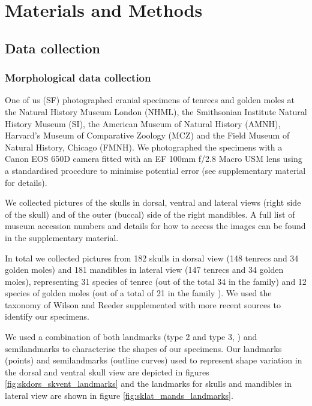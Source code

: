 \documentclass[12pt,a4paper]{article}
\begin{document}
\section{Materials and Methods}

\subsection{Data collection} 

\subsubsection{Morphological data collection} 
	
	One of us (SF) photographed cranial specimens of tenrecs and golden moles at the Natural History Museum London (NHML), the Smithsonian Institute Natural History Museum (SI), the American Museum of Natural History (AMNH), Harvard's Museum of Comparative Zoology (MCZ) and the Field Museum of Natural History, Chicago (FMNH). We photographed the specimens with a Canon EOS 650D camera fitted with an EF 100mm f/2.8 Macro USM lens using a standardised procedure to minimise potential error (see supplementary material for details). 

	We collected pictures of the skulls in dorsal, ventral and lateral views (right side of the skull) and of the outer (buccal) side of the right mandibles. A full list of museum accession numbers and details for how to access the images can be found in the supplementary material.

	In total we collected pictures from 182 skulls in dorsal view (148 tenrecs and 34 golden moles) and 181 mandibles in lateral view (147 tenrecs and 34 golden moles), representing 31 species of tenrec (out of the total 34 in the family) and 12 species of golden moles (out of a total of 21 in the family \citep{Asher2010}). We used the taxonomy of Wilson and Reeder \citeyearpar{Wilson2005} supplemented with more recent sources \citep{IUCN2012, Olson2013} to identify our specimens. 
	

	We used a combination of both landmarks (type 2 and type 3, \citep{Zelditch2012}) and semilandmarks to characterise the shapes of our specimens. Our landmarks (points) and semilandmarks (outline curves) used to represent shape variation in the dorsal and ventral skull view are depicted in figures \ref{fig:skdors_skvent_landmarks} and the landmarks for skulls and mandibles in lateral view are shown in figure \ref{fig:sklat_mands_landmarks}. 
	
\end{document}
